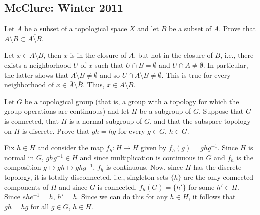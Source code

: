 \subsection{McClure: Winter 2011}
\setcounter{exercise}{0}

\begin{problem}
  Let \(A\) be a subset of a topological space \(X\) and let \(B\) be a
  subset of \(A\). Prove that
  \(\bar A\setminus\bar B\subset\overline{A\setminus B}\).
\end{problem}
\begin{solution}
  Let \(x\in\bar A\setminus\bar B\), then \(x\) is in the closure of \(A\),
  but not in the closure of \(B\), i.e., there exists a neighborhood \(U\)
  of \(x\) such that \(U\cap B=\emptyset\) and \(U\cap A\neq\emptyset\). In
  particular, the latter shows that \(A\setminus B\neq\emptyset\) and so
  \(U\cap A\setminus B\neq\emptyset\). This is true for every neighborhood
  of \(x\in\bar A\setminus\bar B\). Thus, \(x\in\overline{A\setminus B}\).
\end{solution}

\begin{problem}
  Let \(G\) be a topological group (that is, a group with a topology for
  which the group operations are continuous) and let \(H\) be a subgroup of
  \(G\). Suppose that \(G\) is connected, that \(H\) is a normal subgroup
  of \(G\), and that the subspace topology on \(H\) is discrete. Prove that
  \(gh=hg\) for every \(g\in G\), \(h\in G\).
\end{problem}
\begin{solution}
  Fix \(h\in H\) and consider the map \(f_h \colon H\to H\) given by
  \(f_h(g)=ghg^{-1}\). Since \(H\) is normal in \(G\), \(ghg^{-1}\in H\)
  and since multiplication is continuous in \(G\) and \(f_h\) is the
  composition \(g\mapsto gh\mapsto ghg^{-1}\), \(f_h\) is continuous. Now,
  since \(H\) has the discrete topology, it is totally disconnected, i.e.,
  singleton sets \(\{h\}\) are the only connected components of \(H\) and
  since \(G\) is connected, \(f_h(G)=\{h'\}\) for some \(h'\in H\). Since
  \(ehe^{-1}=h\), \(h'=h\). Since we can do this for any \(h\in H\),  it
  follows that \(gh=hg\) for all \(g\in G\), \(h\in H\).
\end{solution}

